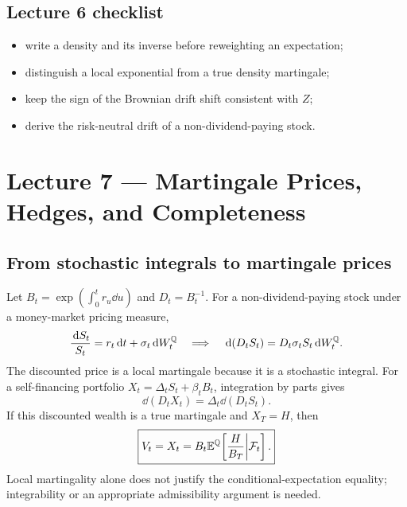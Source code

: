 \subsection*{Lecture 6 checklist}
\begin{itemize}[leftmargin=1.5em,itemsep=0.15em]
  \item write a density and its inverse before reweighting an expectation;
  \item distinguish a local exponential from a true density martingale;
  \item keep the sign of the Brownian drift shift consistent with \(Z\);
  \item derive the risk-neutral drift of a non-dividend-paying stock.
\end{itemize}

\section{Lecture 7 --- Martingale Prices, Hedges, and Completeness}


\subsection{From stochastic integrals to martingale prices}

Let \(B_t=\exp(\int_0^tr_u\dd u)\) and \(D_t=B_t^{-1}\).
For a non-dividend-paying stock under a money-market pricing measure,
\[
\frac{\,\mathrm{d} S_t}{S_t}=r_t\,\mathrm{d} t+\sigma_t\,\mathrm{d} W_t^{\mathbb{Q}}
\quad\Longrightarrow\quad
\,\mathrm{d}(D_tS_t)=D_t\sigma_tS_t\,\mathrm{d} W_t^{\mathbb{Q}}.
\]
The discounted price is a local martingale because it is a stochastic
integral. For a self-financing portfolio
\(X_t=\Delta_tS_t+\beta_tB_t\), integration by parts gives
\[
\boxed{\dd(D_tX_t)=\Delta_t\dd(D_tS_t).}
\]
If this discounted wealth is a true martingale and \(X_T=H\), then
\[
\boxed{
V_t=X_t=B_t\mathbb{E}^{\mathbb{Q}}\!\left[\frac{H}{B_T}\middle|\mathcal{F}_t\right].}
\]
Local martingality alone does not justify the conditional-expectation
equality; integrability or an appropriate admissibility argument is
needed.

